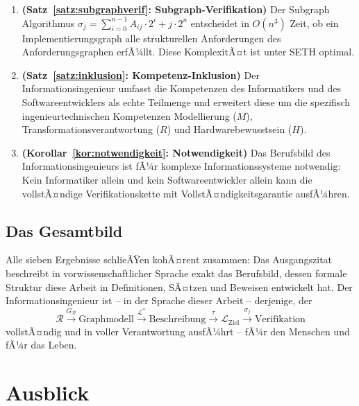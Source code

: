 ﻿\documentclass[a4paper,12pt]{article}
\theoremstyle{definition}
\begin{document}
\begin{enumerate}
  \item \textbf{(Satz~\ref{satz:subgraphverif}: Subgraph-Verifikation)}
        Der Subgraph Algorithmus
        $\sigma_j = \sum_{i=0}^{n-1} A_{ij} \cdot 2^i + j \cdot 2^n$
        entscheidet in $O(n^3)$ Zeit, ob ein Implementierungsgraph alle strukturellen
        Anforderungen des Anforderungsgraphen erfÃ¼llt. Diese KomplexitÃ¤t ist unter SETH
        optimal.

  \item \textbf{(Satz~\ref{satz:inklusion}: Kompetenz-Inklusion)}
        Der Informationsingenieur umfasst die Kompetenzen des Informatikers und des
        Softwareentwicklers als echte Teilmenge und erweitert diese um die spezifisch
        ingenieurtechnischen Kompetenzen Modellierung ($M$), Transformationsverantwortung
        ($R$) und Hardwarebewusstsein ($H$).

  \item \textbf{(Korollar~\ref{kor:notwendigkeit}: Notwendigkeit)}
        Das Berufsbild des Informationsingenieurs ist fÃ¼r komplexe Informationssysteme
        notwendig: Kein Informatiker allein und kein Softwareentwickler allein kann
        die vollstÃ¤ndige Verifikationskette mit VollstÃ¤ndigkeitsgarantie ausfÃ¼hren.
\end{enumerate}

\subsection{Das Gesamtbild}

Alle sieben Ergebnisse schlieÃŸen kohÃ¤rent zusammen: Das Ausgangszitat beschreibt
in vorwissenschaftlicher Sprache exakt das Berufsbild, dessen formale Struktur
diese Arbeit in Definitionen, SÃ¤tzen und Beweisen entwickelt hat.
Der Informationsingenieur ist -- in der Sprache dieser Arbeit -- derjenige, der
\[
  \mathcal{R}
  \xrightarrow{G_\mathcal{R}} \text{Graphmodell}
  \xrightarrow{\mathcal{L}^*} \text{Beschreibung}
  \xrightarrow{\tau} \mathcal{L}_{\text{Ziel}}
  \xrightarrow{\sigma_j} \text{Verifikation}
\]
vollstÃ¤ndig und in voller Verantwortung ausfÃ¼hrt -- fÃ¼r den Menschen und fÃ¼r das Leben.

\section{Ausblick}
\label{sec:ausblick}
\end{document}

